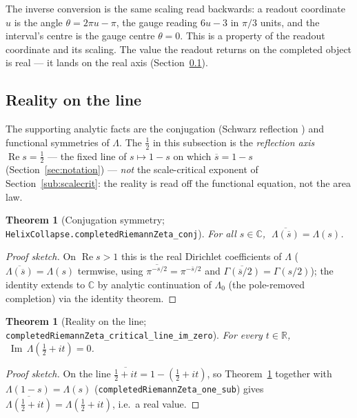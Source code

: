 \documentclass[11pt]{article}
\newtheorem{theorem}[definition]{Theorem}
\DeclareMathOperator{\Ree}{Re}
\DeclareMathOperator{\Imm}{Im}
\newcommand{\C}{\mathbb{C}}
\newcommand{\R}{\mathbb{R}}
\newcommand{\conj}[1]{\overline{#1}}
\newcommand{\code}[1]{\texttt{#1}}
\begin{document}
The inverse conversion is the same scaling read backwards: a readout coordinate $u$ is the angle
$\theta=2\pi u-\pi$, the gauge reading $6u-3$ in $\pi/3$ units, and the interval's centre is the gauge
centre $\theta=0$. This is a property of the readout coordinate and its scaling. The value the readout
returns on the completed object is real --- it lands on the real axis (Section~\ref{sub:reality}).

\subsection{Reality on the line}\label{sub:reality}

The supporting analytic facts are the conjugation (Schwarz reflection \cite{Ahlfors1979}) and
functional symmetries of $\Lambda$. The $\tfrac12$ in this subsection is the \emph{reflection axis}
$\Ree s=\tfrac12$ --- the fixed line of $s\mapsto 1-s$ on which $\conj s=1-s$
(Section~\ref{sec:notation}) --- \emph{not} the scale-critical exponent of
Section~\ref{sub:scalecrit}: the reality is read off the functional equation, not the area law.

\begin{theorem}[Conjugation symmetry; \code{HelixCollapse.completedRiemannZeta\_conj}]\label{thm:conj}
For all $s\in\C$, $\;\conj{\Lambda(\conj s)}=\Lambda(s)$.
\end{theorem}

\begin{proof}[Proof sketch]
On $\Ree s>1$ this is the real Dirichlet coefficients of $\Lambda$ ($\conj{\Lambda(\conj s)}=\Lambda(s)$
termwise, using $\conj{\pi^{-s/2}}=\pi^{-\conj s/2}$ and $\conj{\Gamma(\conj{s}/2)}=\Gamma(s/2)$); the
identity extends to $\C$ by analytic continuation of $\Lambda_0$ (the pole-removed completion) via the
identity theorem.
\end{proof}

\begin{theorem}[Reality on the line; \code{completedRiemannZeta\_critical\_line\_im\_zero}]\label{thm:real}
For every $t\in\R$, $\;\Imm\,\Lambda(\tfrac12+it)=0$.
\end{theorem}

\begin{proof}[Proof sketch]
On the line $\conj{\tfrac12+it}=1-(\tfrac12+it)$, so Theorem~\ref{thm:conj} together with
$\Lambda(1-s)=\Lambda(s)$ (\code{completedRiemannZeta\_one\_sub}) gives
$\conj{\Lambda(\tfrac12+it)}=\Lambda(\tfrac12+it)$, i.e.\ a real value.
\end{proof}
\end{document}
